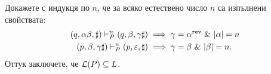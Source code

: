 \begin{extra}
\begin{example}
\begin{enumerate}[a)]
    Докажете с индукця по $n$, че за всяко естествено число $n$ са изпълнени свойствата:
    \begin{align}
      (q, \alpha\beta, \sharp) \vdash^n_P (q, \beta, \gamma\sharp) & \implies \gamma = \alpha^{\texttt{rev}}\ \&\ |\alpha| = n \label{eq:omega-omega-r:3}\\
      (p, \beta, \gamma\sharp) \vdash^n_P (p, \varepsilon, \sharp) & \implies \gamma = \beta\ \&\ |\beta| = n. \label{eq:omega-omega-r:4}
    \end{align}
    Оттук заключете, че $\mathcal{L}(P) \subseteq L$.
  \end{enumerate}
\end{example}



\end{extra}
